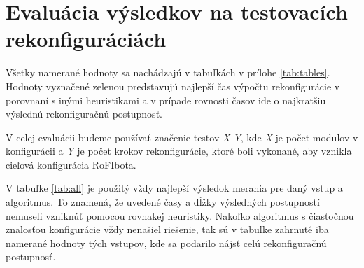 \documentclass[
  printed, %
  oneside, %
  notable,   %
  nolof,     %
  nolot,     %
]{fithesis3}
\begin{document}
\section{Evaluácia výsledkov na testovacích rekonfiguráciách}
Všetky namerané hodnoty sa nachádzajú v tabuľkách v prílohe \ref{tab:tables}. Hodnoty vyznačené \colorbox{table-green}{zelenou} predstavujú najlepší čas výpočtu rekonfigurácie v porovnaní s inými heuristikami a v prípade rovnosti časov ide o najkratšiu výslednú rekonfiguračnú postupnosť. 

V celej evaluácii budeme používať značenie testov \textit{X-Y}, kde \textit{X} je počet modulov v konfigurácii a \textit{Y} je počet krokov rekonfigurácie, ktoré boli vykonané, aby vznikla cieľová konfigurácia RoFIbota. 

V tabuľke \ref{tab:all} je použitý vždy najlepší výsledok merania pre daný vstup a algoritmus. To znamená, že uvedené časy a dĺžky výsledných postupností nemuseli vzniknúť pomocou rovnakej heuristiky. Nakoľko algoritmus s čiastočnou znalosťou konfigurácie vždy nenašiel riešenie, tak sú v tabuľke zahrnuté iba namerané hodnoty tých vstupov, kde sa podarilo nájsť celú rekonfiguračnú postupnosť. 
\end{document}
